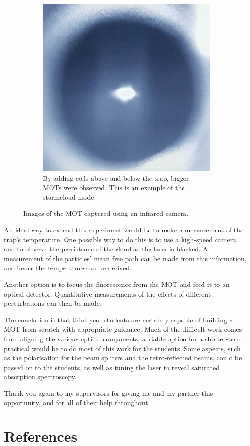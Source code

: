 \documentclass[11pt,twoside,a4paper]{article}
\begin{document}
\begin{figure}[h]
\begin{subfigure}{.3\textwidth}
        \includegraphics[width=.7\textwidth]{images/success3}
        \caption{By adding coils above and below the trap, bigger MOTs were observed. This is an example of the stormcloud mode.}
    \end{subfigure}

    \caption{Images of the MOT captured using an infrared camera.}
\end{figure}

An ideal way to extend this experiment would be to make a measurement of the trap's temperature. One possible way to do this is to use a high-speed camera, and to observe
the persistence of the cloud as the laser is blocked. A measurement of the particles' mean free path can be made from this information, and hence the temperature can be derived.

Another option is to focus the fluorescence from the MOT and feed it to an optical detector. Quantitative measurements of the effects of different perturbations can then be made.

The conclusion is that third-year students are certainly capable of building a MOT from scratch with appropriate guidance. Much of the difficult work comes from aligning the various
optical components; a viable option for a shorter-term practical would be to do most of this work for the students. Some aspects, such as the polarisation for the beam spliters and
the retro-reflected beams, could be passed on to the students, as well as tuning the laser to reveal saturated absorption spectroscopy.

Thank you again to my supervisors for giving me and my partner this opportunity, and for all of their help throughout.
\section{References}


\end{document}
